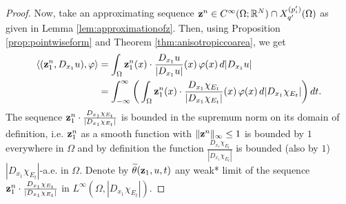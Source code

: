 \documentclass[reqno,12pt]{amsart}
\def\z{{\bf z}}
\numberwithin{equation}{section}
\begin{document}
\begin{proof}
Now, take an approximating sequence $\z^n \in C^\infty(\Omega; \mathbb{R}^N) \cap X_{q'}^{(p'_i)}(\Omega)$ as given in Lemma \ref{lem:approximationofz}. Then, using Proposition \ref{prop:pointwiseform} and Theorem \ref{thm:anisotropiccoarea}, we get
\begin{align}
\langle (\z^n_1, D_{x_1} u), \varphi \rangle &= \int_\Omega \z_1^n(x) \cdot \frac{D_{x_1} u}{|D_{x_1} u|}(x) \, \varphi(x) \, d|D_{x_1} u| \\
&= \int_{-\infty}^{\infty} \bigg( \int_\Omega \z_1^n(x) \cdot \frac{D_{x_1} \chi_{E_t}}{|D_{x_1} \chi_{E_t}|}(x) \, \varphi(x) \, d|D_{x_1} \chi_{E_t}| \bigg) \, dt.
\end{align}
The sequence $\z_1^n \cdot \frac{D_{x_1} \chi_{E_t}}{|D_{x_1} \chi_{E_t}|}$ is bounded in the supremum norm on its domain of definition, i.e. $\z_1^n$ as a smooth function with $\| \z^n \|_\infty \leq 1$ is bounded by $1$ everywhere in $\Omega$ and by definition the function $\frac{D_{x_1} \chi_{E_t}}{|D_{x_1} \chi_{E_t}|}$ is bounded (also by $1$) $|D_{x_1} \chi_{E_t}|$-a.e. in $\Omega$. Denote by $\widetilde{\theta}(\z_1,u,t)$ any weak* limit of the sequence $\z_1^n \cdot \frac{D_{x_1} \chi_{E_t}}{|D_{x_1} \chi_{E_t}|}$ in $L^\infty(\Omega, |D_{x_1} \chi_{E_t}|)$.  


\end{proof}
\end{document}
